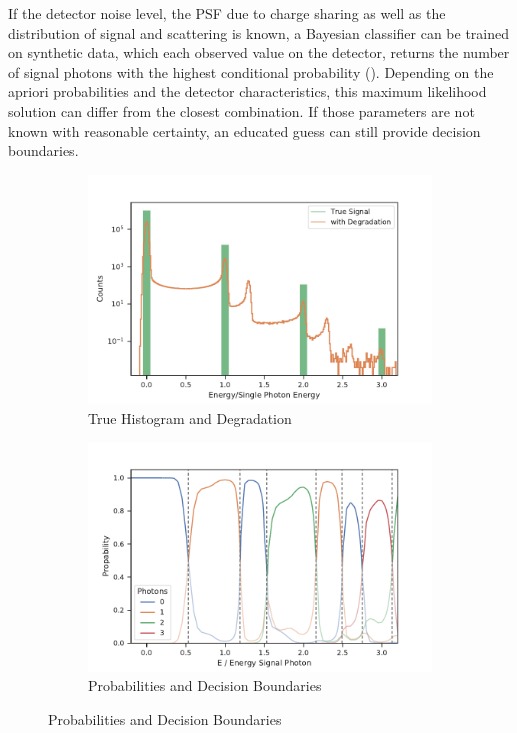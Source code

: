 If the detector noise level, the PSF due to charge sharing as well as the distribution of signal and scattering is known, a Bayesian classifier can be trained on synthetic data, which each observed value on the detector, returns the number of signal photons with the highest conditional probability (). Depending on the apriori probabilities and the detector characteristics, this maximum likelihood solution can differ from the closest combination. If those parameters are not known with reasonable certainty, an educated guess can still provide decision boundaries.

\begin{figure}
	\centering
	\begin{subfigure}[b]{0.45\textwidth}
		\includegraphics[width=\linewidth]{images/sharing.pdf}
		\caption{True Histogram and Degradation}
		\label{fig:degrad}
	\end{subfigure}
	\begin{subfigure}[b]{0.45\textwidth}
		\includegraphics[width=\linewidth]{images/probs.pdf}
		\caption{Probabilities and Decision Boundaries}
		\label{fig:probs}
	\end{subfigure}
	

\end{figure}
